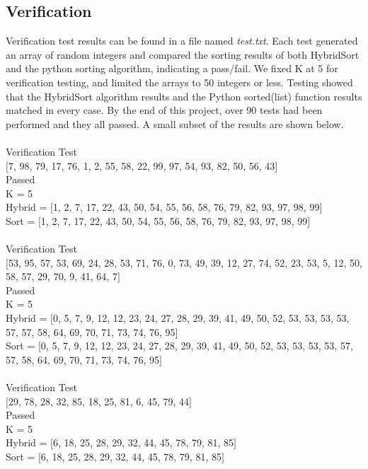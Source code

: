 \documentclass{article}
\begin{document}
\subsection{Verification}
Verification test results can be found in a file named \textit{test.txt}. Each test generated an array of random integers and compared the sorting results of both HybridSort and the python sorting algorithm, indicating a pass/fail. We fixed K at 5 for verification testing, and limited the arrays to 50 integers or less. Testing showed that the HybridSort algorithm results and the Python sorted(list) function results matched in every case. By the end of this project, over 90 tests had been performed and they all passed. A small subset of the results are shown below. \\ \\
\ttfamily
Verification Test \\
$[$7, 98, 79, 17, 76, 1, 2, 55, 58, 22, 99, 97, 54, 93, 82, 50, 56, 43$]$ \\
Passed \\
K = 5 \\
Hybrid =  $[$1, 2, 7, 17, 22, 43, 50, 54, 55, 56, 58, 76, 79, 82, 93, 97, 98, 99$]$ \\
Sort =  $[$1, 2, 7, 17, 22, 43, 50, 54, 55, 56, 58, 76, 79, 82, 93, 97, 98, 99$]$ \\
\\
Verification Test \\
$[$53, 95, 57, 53, 69, 24, 28, 53, 71, 76, 0, 73, 49, 39, 12, 27, 74, 52, 23, 53, 5, 12, 50, 58, 57, 29, 70, 9, 41, 64, 7$]$ \\
Passed \\
K = 5 \\
Hybrid =  $[$0, 5, 7, 9, 12, 12, 23, 24, 27, 28, 29, 39, 41, 49, 50, 52, 53, 53, 53, 53, 57, 57, 58, 64, 69, 70, 71, 73, 74, 76, 95$]$ \\
Sort =  $[$0, 5, 7, 9, 12, 12, 23, 24, 27, 28, 29, 39, 41, 49, 50, 52, 53, 53, 53, 53, 57, 57, 58, 64, 69, 70, 71, 73, 74, 76, 95$]$ \\
\\
Verification Test \\
$[$29, 78, 28, 32, 85, 18, 25, 81, 6, 45, 79, 44$]$ \\
Passed \\
K = 5 \\
Hybrid =  $[$6, 18, 25, 28, 29, 32, 44, 45, 78, 79, 81, 85$]$ \\
Sort =  $[$6, 18, 25, 28, 29, 32, 44, 45, 78, 79, 81, 85$]$ \\
\end{document}
